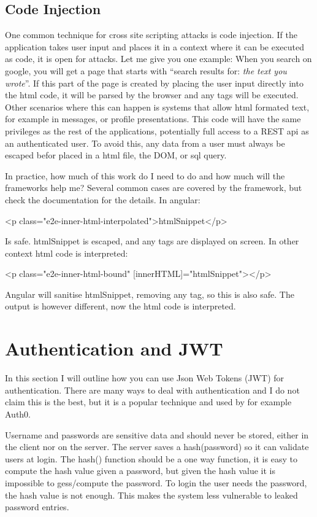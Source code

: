 \section{Code Injection} \label{chapter:code:injection}
One common technique for cross site scripting attacks is code injection. If the application takes user input and places it in a context where it can be executed as code, it is open for attacks. Let me give you one example: When you search on google, you will get a page that starts with ``search results for: \emph{the text you wrote}''. If this part of the page is created by placing the user input directly into the html code, it will be parsed by the browser and any  tags will be executed. Other scenarios where this can happen is systems that allow html formated text, for example in messages, or profile presentations. This code will have the same privileges as the rest of the applications, potentially full access to a REST api as an authenticated user. To avoid this, any data from a user must always be escaped befor placed in a html file, the DOM, or sql query.

In practice, how much of this work do I need to do and how much will the frameworks help me? Several common cases are covered by the framework, but check the documentation for the details. In angular:
\begin{Code}
<p class="e2e-inner-html-interpolated">{{htmlSnippet}}</p>
\end{Code}
Is safe. htmlSnippet is escaped, and any tags are displayed on screen. In other context html code is interpreted:
\begin{Code}
<p class="e2e-inner-html-bound" [innerHTML]="htmlSnippet"></p>
\end{Code}
Angular will sanitise htmlSnippet, removing any  tag, so this is also safe. The output is however different, now the html code is interpreted.


\chapter{Authentication and JWT} \label{chapter:auth}
In this section I will outline how you can use Json Web Tokens (JWT) for authentication. There are many ways to deal with authentication and I do not claim this is the best, but it is a popular technique and used by for example Auth0.

Username and passwords are sensitive data and should never be stored, either in the client nor on the server. The server saves a hash(password) so it can validate users at login. The hash() function should be a one way function, it is easy to compute the hash value given a password, but given the hash value it is impossible to gess/compute the password. To login the user needs the password, the hash value is not enough. This makes the system less vulnerable to leaked password entries.

